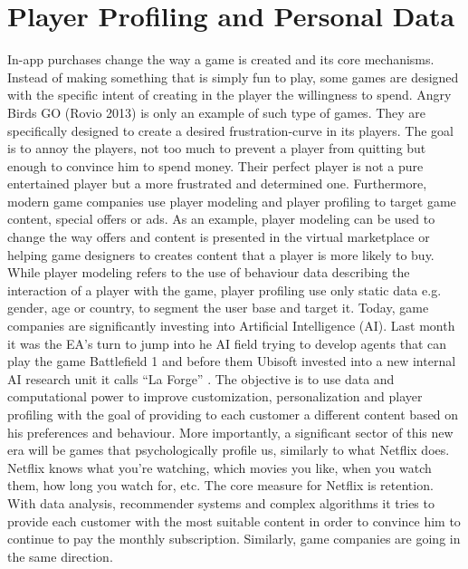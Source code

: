 \section{Player Profiling and Personal Data}

In-app purchases change the way a game is created and its core mechanisms. Instead of making something that is simply fun to play, some games are designed with the specific intent of creating in the player the willingness to spend. Angry Birds GO (Rovio 2013) is only an example of such type of games. They are specifically designed to create a desired frustration-curve in its players. The goal is to annoy the players, not too much to prevent a player from quitting but enough to convince him to spend money. Their perfect player is not a pure entertained player but a more frustrated and determined one. Furthermore, modern game companies use player modeling and player profiling to target game content, special offers or ads. As an example, player modeling can be used to change the way offers and content is presented in the virtual marketplace or helping game designers to creates content that a player is more likely to buy. While player modeling refers to the use of behaviour data describing the interaction of a player with the game, player profiling use only static data e.g. gender, age or country, to segment the user base and target it. Today, game companies are significantly investing into Artificial Intelligence (AI). Last month it was the EA's turn to jump into he AI field trying to develop agents that can play the game Battlefield 1 \cite{vincent_ea_2018} and before them Ubisoft invested into a new internal AI research unit it calls “La Forge” \cite{_ubisoft_2017}. The objective is to use data and computational power to improve customization, personalization and player profiling with the goal of providing to each customer a different content based on his preferences and behaviour.
More importantly, a significant sector of this new era will be games that psychologically profile us, similarly to what Netflix does. Netflix knows what you're watching, which movies you like, when you watch them, how long you watch for, etc. The core measure for Netflix is retention. With data analysis, recommender systems and complex algorithms it tries to provide each customer with the most suitable content in order to convince him to continue to pay the monthly subscription. Similarly, game companies are going in the same direction.

